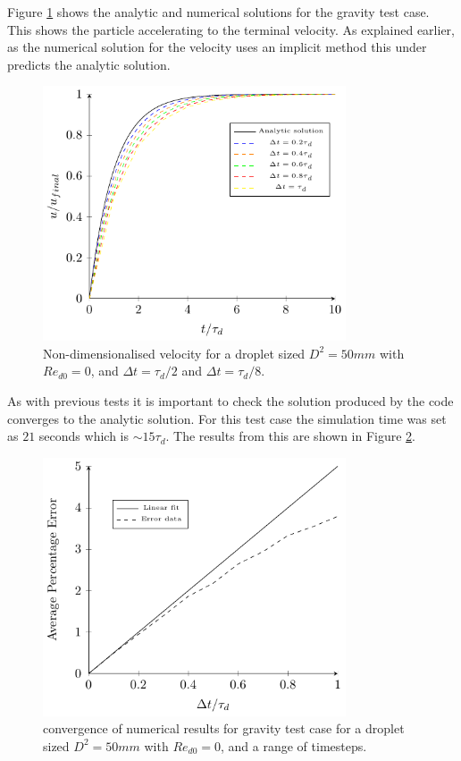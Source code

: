 \documentclass[../Interim_Report_Master]{subfiles}
\begin{document}
Figure \ref{vel_time_tau_4} shows the analytic and numerical solutions for the gravity test case. This shows the particle accelerating to the terminal velocity. As explained earlier, as the numerical solution for the velocity uses an implicit method this under predicts the analytic solution.
\begin{figure}[H]
	\centering
	\includegraphics[width=0.8\textwidth]{./Diagrams/Gravity_Verification_Test/Gravity_Verification_Test.pdf}
	\caption{Non-dimensionalised velocity for a droplet sized $D^2=50mm$ with $Re_{d0}=0$, and $\Delta t=\tau_d/2$ and $\Delta t=\tau_d/8$.}
	\label{vel_time_tau_4}
\end{figure}

As with previous tests it is important to check the solution produced by the code converges to the analytic solution. For this test case the simulation time was set as $21$ seconds which is $\sim15\tau_d$. The results from this are shown in Figure \ref{gravity_con}.

\begin{figure}[H]
	\centering
	\includegraphics[width=0.8\textwidth]{./Diagrams/Gravity_Verification_Test/Gravity_Convergence/Gravity_Convergence.pdf}
	\caption{convergence of numerical results for gravity test case for a droplet sized $D^2=50mm$ with $Re_{d0}=0$, and a range of timesteps.}
	\label{gravity_con}
\end{figure}
\end{document}
